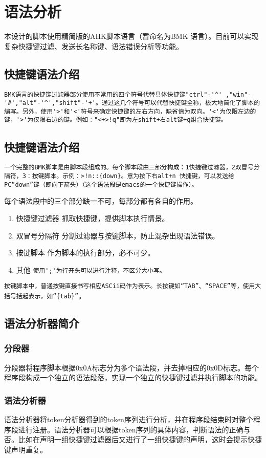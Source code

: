 \section{语法分析}
本设计的脚本使用精简版的AHK脚本语言（暂命名为BMK 语言）。目前可以实现复杂快捷键过滤、发送长名称键、语法错误分析等功能。
\subsection{快捷键语法介绍}
\verb|BMK语言的快捷键过滤器部分使用不常用的四个符号代替具体快捷键"ctrl"-'^' ,"win"-'#',"alt"-'^',"shift"-'+'。通过这几个符号可以代替快捷键全称，极大地简化了脚本的编写。另外，使用'>'和'<'符号来确定快捷键的左右方向，缺省值为双向。'<'为仅限左边的键，'>'为仅限右边的键。例如："<+>!q"即为左shift+右alt键+q组合快捷键。|

\subsection{快捷键语法介绍}
\verb|一个完整的BMK脚本是由脚本段组成的。每个脚本段由三部分构成：1快捷键过滤器，2双冒号分隔符，3：按键脚本。示例：>!n::{down}。意为按下右alt+n 快捷键，可以发送给PC“down”键（即向下箭头）（这个语法段是emacs的一个快捷键操作）。|

每个语法段中的三个部分缺一不可，每部分都有各自的作用。
\begin{enumerate}
\item 快捷键过滤器
抓取快捷键，提供脚本执行情景。

\item 双冒号分隔符
分割过滤器与按键脚本，防止混杂出现语法错误。

\item 按键脚本
作为脚本的执行部分，必不可少。

\item 其他
\verb|使用';'为行开头可以进行注释，不区分大小写。|
\end{enumerate}
\verb|按键脚本中，普通按键直接书写相应ASCii码作为表示。长按键如“TAB”、“SPACE”等，使用大括号括起表示，如“{tab}”|。
\subsection{语法分析器简介}
\subsubsection{分段器}
分段器将程序脚本根据0x0A标志分为多个语法段，并去掉相应的0x0D标志。每个程序段构成一个独立的语法段落，实现一个独立的快捷键过滤并执行脚本的功能。
\subsubsection{语法分析器}
语法分析器将token分析器得到的token序列进行分析，并在程序段结束时对整个程序段进行注册。语法分析器可以根据token序列的具体内容，判断语法的正确与否。比如在声明一组快捷键过滤器后又进行了一组快捷键的声明，这时会提示快捷键声明重复。
